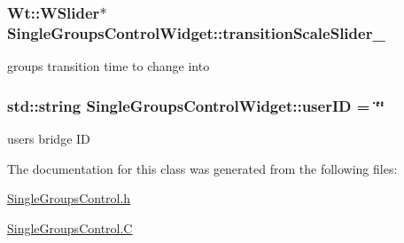\subsubsection[{\texorpdfstring{transition\+Scale\+Slider\+\_\+}{transitionScaleSlider_}}]{\setlength{\rightskip}{0pt plus 5cm}Wt\+::\+W\+Slider$\ast$ Single\+Groups\+Control\+Widget\+::transition\+Scale\+Slider\+\_\+\hspace{0.3cm}{\ttfamily [private]}}\hypertarget{classSingleGroupsControlWidget_af1811831d7031863931a9baaa97207a0}{}\label{classSingleGroupsControlWidget_af1811831d7031863931a9baaa97207a0}
group\textquotesingle{}s transition time to change into 
\subsubsection[{\texorpdfstring{user\+ID}{userID}}]{\setlength{\rightskip}{0pt plus 5cm}std\+::string Single\+Groups\+Control\+Widget\+::user\+ID = \char`\"{}\char`\"{}\hspace{0.3cm}{\ttfamily [private]}}\hypertarget{classSingleGroupsControlWidget_a8e485f9b17c2934de11f8991a7b38bf6}{}\label{classSingleGroupsControlWidget_a8e485f9b17c2934de11f8991a7b38bf6}
user\textquotesingle{}s bridge ID 

The documentation for this class was generated from the following files\+:\begin{DoxyCompactItemize}
\item 
\hyperlink{SingleGroupsControl_8h}{Single\+Groups\+Control.\+h}\item 
\hyperlink{SingleGroupsControl_8C}{Single\+Groups\+Control.\+C}\end{DoxyCompactItemize}
